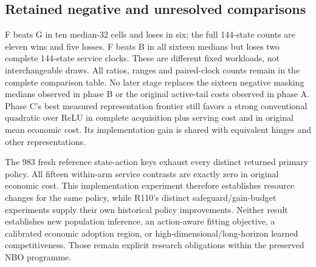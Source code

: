 \subsection{Retained negative and unresolved comparisons}
F beats G in ten median-32 cells and loses in six; the full 144-state
counts are eleven wins and five losses.  F beats B in all sixteen
medians but loses two complete 144-state service clocks.  These are
different fixed workloads, not interchangeable draws.  All ratios,
ranges and paired-clock counts remain in the complete comparison
table.  No later stage replaces the sixteen negative masking medians
observed in phase B or the original active-tail costs observed in
phase A.  Phase C's best measured representation frontier still favors
a strong conventional quadratic over ReLU in complete acquisition plus
serving cost and in original mean economic cost.  Its implementation
gain is shared with equivalent hinges and other representations.

The 983 fresh reference state-action keys exhaust every distinct
returned primary policy.  All fifteen within-arm service contrasts
are exactly zero in original economic cost.  This implementation
experiment therefore establishes resource changes for the same
policy, while R110's distinct safeguard/gain-budget experiments supply
their own historical policy improvements.  Neither result establishes
new population inference, an action-aware fitting objective, a
calibrated economic adoption region, or high-dimensional/long-horizon
learned competitiveness.  Those remain explicit research obligations
within the preserved NBO programme.
